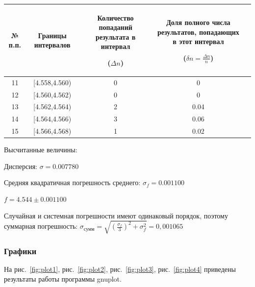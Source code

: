 \begin{center}
\label{tabl:11}
\begin{tabular}{|c|c|c|c|c|}
\hline
\begin{minipage}{1cm}
    № п.п.
\end{minipage}&
\begin{minipage}{5cm}
    Границы интервалов
\end{minipage} &
\begin{minipage}{5cm}
    Количество попаданий результата в интервал

    ($\Delta n$)
\end{minipage} &
\begin{minipage}{5cm}
    Доля полного числа результатов, попадающих в этот интервал
    
    ($\delta n=\frac{\Delta n}{n}$)
\end{minipage}\\
\hline
11 &  [4.558,4.560)  &  0 & 0 \\
12 &  [4.560,4.562) &  0 & 0 \\
13 &  [4.562,4.564)  &  2 & 0.04 \\
14 &  [4.564,4.566)  &  3 & 0.06 \\
15 &  [4.566,4.568)  &  1 & 0.02 \\
\hline
\end{tabular}
\end{center}


Высчитанные величины:

Дисперсия: $\sigma=0.007780$

Средняя квадратичная погрешность среднего: $\sigma_f=0.001100$

$f=4.544\pm0.001100$

Случайная и системная погрешности имеют одинаковый порядок, поэтому суммарная погрешность: $\sigma_{сумм}=\sqrt{(\frac{\sigma_f}{3})^2+\sigma_f^2} =0,001065$

\subsubsection{Графики}

На рис.~\ref{fig:plot1}, рис.~\ref{fig:plot2}, рис.~\ref{fig:plot3}, рис.~\ref{fig:plot4} приведены результаты работы программы gnuplot.

